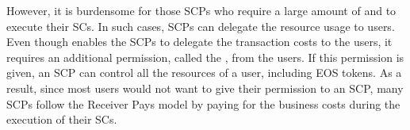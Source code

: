 However, it is burdensome for those SCPs who require a large amount of \cpu and
\net to execute their SCs. In such cases, SCPs can delegate the resource usage to
users.
%
Even though \eos enables the SCPs to delegate the transaction costs to the
users, it requires an additional permission, called the \code, from the users. If
this permission is given, an SCP can control all the resources of a user,
including EOS tokens.
As a result, since most users would not want to give their permission to an
SCP, many SCPs follow the Receiver Pays model by paying for the business costs
during the execution of their SCs.
